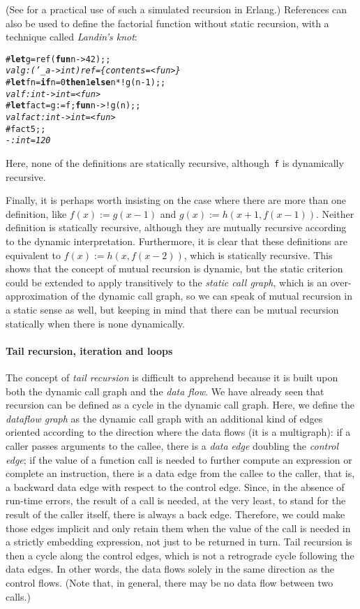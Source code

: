 \documentclass[11pt,a4paper]{article}
\newcommand\plang[1]{\textsf{#1}\xspace}
\newcommand\exc[1]{\texttt{\small #1}}
\begin{document}
\noindent (See \textcite{GoldbergWiener:2009} for a practical use of such
a simulated recursion in \plang{Erlang}.) References can also be used
to define the factorial function without static recursion, with a
technique called \emph{Landin's knot}: {\small
\begin{alltt}
# \textbf{let} g = ref (\textbf{fun} n -> 42);;
\emph{val g : ('_a -> int) ref = \{contents = <fun>\}}
# \textbf{let} f n = \textbf{if} n = 0 \textbf{then} 1 \textbf{else} n * !g(n-1);;
\emph{val f : int -> int = <fun>}
# \textbf{let} fact = g := f; \textbf{fun} n -> !g(n);;
\emph{val fact : int -> int = <fun>}
# fact 5;;
\emph{- : int = 120}
\end{alltt}
}
\noindent Here, none of the definitions are statically recursive,
although~\exc{f} is dynamically recursive.

Finally, it is perhaps worth insisting on the case where there are
more than one definition, like \(f(x) := g(x-1)\) and \(g(x) :=
h(x+1,f(x-1))\). Neither definition is statically recursive, although
they are mutually recursive according to the dynamic
interpretation. Furthermore, it is clear that these definitions are
equivalent to \(f(x) := h(x,f(x-2))\), which is statically
recursive. This shows that the concept of mutual recursion is dynamic,
but the static criterion could be extended to apply transitively to
the \emph{static call graph}, which is an over\hyp{}approximation of
the dynamic call graph, so we can speak of mutual recursion in a
static sense as well, but keeping in mind that there can be mutual
recursion statically when there is none dynamically.

\paragraph{Tail recursion, iteration and loops}

The concept of \emph{tail recursion} is difficult to apprehend because
it is built upon both the dynamic call graph and the \emph{data
  flow}. We have already seen that recursion can be defined as a cycle
in the dynamic call graph. Here, we define the \emph{dataflow graph}
as the dynamic call graph with an additional kind of edges oriented
according to the direction where the data flows (it is a multigraph):
if a caller passes arguments to the callee, there is a \emph{data
  edge} doubling the \emph{control edge}; if the value of a function
call is needed to further compute an expression or complete an
instruction, there is a data edge from the callee to the caller, that
is, a backward data edge with respect to the control edge. Since, in
the absence of run\hyp{}time errors, the result of a call is needed,
at the very least, to stand for the result of the caller itself, there
is always a back edge. Therefore, we could make those edges implicit
and only retain them when the value of the call is needed in a
strictly embedding expression, not just to be returned in turn. Tail
recursion is then a cycle along the control edges, which is not a
retrograde cycle following the data edges. In other words, the data
flows solely in the same direction as the control flows. (Note that,
in general, there may be no data flow between two calls.)
\end{document}
